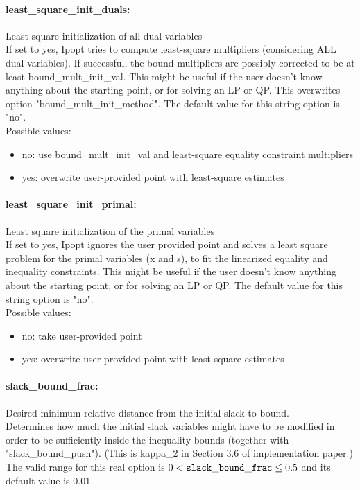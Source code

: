 \paragraph{least\_square\_init\_duals:}\label{sec:least_square_init_duals} Least square initialization of all dual variables $\;$ \\
 If set to yes, Ipopt tries to compute
least-square multipliers (considering ALL dual
variables).  If successful, the bound multipliers
are possibly corrected to be at least
bound\_mult\_init\_val. This might be useful if
the user doesn't know anything about the starting
point, or for solving an LP or QP.  This
overwrites option "bound\_mult\_init\_method".
The default value for this string option is "no".
\\ 
Possible values:
\begin{itemize}
   \item no: use bound\_mult\_init\_val and least-square
equality constraint multipliers
   \item yes: overwrite user-provided point with least-square
estimates
\end{itemize}

\paragraph{least\_square\_init\_primal:}\label{sec:least_square_init_primal} Least square initialization of the primal variables $\;$ \\
 If set to yes, Ipopt ignores the user provided
point and solves a least square problem for the
primal variables (x and s), to fit the linearized
equality and inequality constraints.  This might
be useful if the user doesn't know anything about
the starting point, or for solving an LP or QP.
The default value for this string option is "no".
\\ 
Possible values:
\begin{itemize}
   \item no: take user-provided point
   \item yes: overwrite user-provided point with least-square
estimates
\end{itemize}

\paragraph{slack\_bound\_frac:}\label{sec:slack_bound_frac} Desired minimum relative distance from the initial slack to bound. $\;$ \\
 Determines how much the initial slack variables
might have to be modified in order to be
sufficiently inside the inequality bounds
(together with "slack\_bound\_push").  (This is
kappa\_2 in Section 3.6 of implementation paper.) The valid range for this real option is 
$0 <  {\tt slack\_bound\_frac } \le 0.5$
and its default value is $0.01$.


